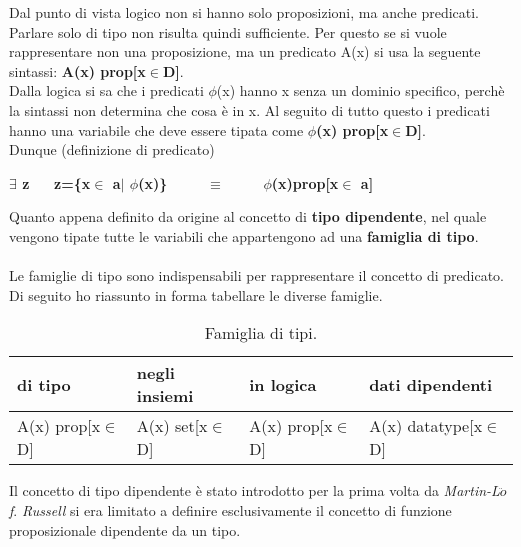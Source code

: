 Dal punto di vista logico non si hanno solo proposizioni, ma anche predicati. Parlare solo di tipo non risulta quindi sufficiente. Per questo se si vuole rappresentare non una proposizione, ma un predicato A(x) si usa la seguente sintassi: \textbf{A(x) prop[x$\in$D]}.\\
Dalla logica si sa che i predicati $\phi$(x) hanno x senza un dominio specifico, perch\`e la sintassi non determina che cosa \`e in x. Al seguito di tutto questo i predicati hanno una variabile che deve essere tipata come \textbf{$\phi$(x) prop[x$\in$D]}.\\
Dunque (definizione di predicato)
\begin{center}\textbf{$\exists$ z $\quad$ z=\{x$\in$ a$|$ $\phi$(x)\} $\qquad$ $\equiv$ $\qquad$ $\phi$(x)prop[x$\in$ a]}\end{center}
\noindent
Quanto appena definito da origine al concetto di \textbf{tipo dipendente}, nel quale vengono tipate tutte le variabili che appartengono ad una \textbf{famiglia di tipo}.\\\\
Le famiglie di tipo sono indispensabili per rappresentare il concetto di predicato. Di seguito ho riassunto in forma tabellare le diverse famiglie.\\

\begin{table}[h]
\centering
\begin{tabularx}{\textwidth}{XXXp{3.1cm}}
\hline 
\rowcolor{orange}
{\color[HTML]{FFFFFF}\textbf{di tipo}} & {\color[HTML]{FFFFFF}\textbf{negli insiemi}} & {\color[HTML]{FFFFFF} \textbf{in logica}} & {\color[HTML]{FFFFFF}\textbf{dati dipendenti}} \\
\hline\hline 
A(x) prop[x$\in$D] & A(x) set[x$\in$D] & A(x) prop[x$\in$D] & A(x) datatype[x$\in$D]  \\  
\hline 
\end{tabularx}
\caption{\label{tab:famiglia-di-tipi}Famiglia di tipi.} 
\end{table}
\noindent
Il concetto di tipo dipendente \`e stato introdotto per la prima volta da \textit{Martin-L$\ddot{o}$f}. \textit{Russell} si era limitato a definire esclusivamente il concetto di funzione proposizionale dipendente da un tipo.
\newpage
